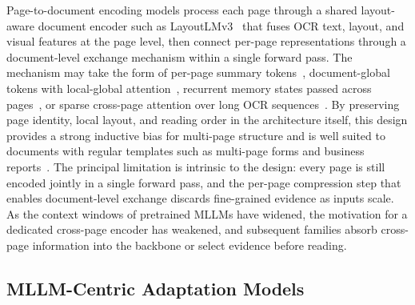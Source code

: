 Page-to-document encoding models process each page through a shared layout-aware document encoder such as LayoutLMv3~\cite{huang2022layoutlmv3} that fuses OCR text, layout, and visual features at the page level, then connect per-page representations through a document-level exchange mechanism within a single forward pass. The mechanism may take the form of per-page summary tokens~\cite{tito2023hierarchical}, document-global tokens with local-global attention~\cite{blau2024gram}, recurrent memory states passed across pages~\cite{dong2024multi}, or sparse cross-page attention over long OCR sequences~\cite{borchmann2025arctic}. By preserving page identity, local layout, and reading order in the architecture itself, this design provides a strong inductive bias for multi-page structure and is well suited to documents with regular templates such as multi-page forms and business reports~\cite{tito2023hierarchical, borchmann2025arctic}. The principal limitation is intrinsic to the design: every page is still encoded jointly in a single forward pass, and the per-page compression step that enables document-level exchange discards fine-grained evidence as inputs scale. As the context windows of pretrained MLLMs have widened, the motivation for a dedicated cross-page encoder has weakened, and subsequent families absorb cross-page information into the backbone or select evidence before reading.

\subsection{MLLM-Centric Adaptation Models}
\label{sec:arch-mllm}

